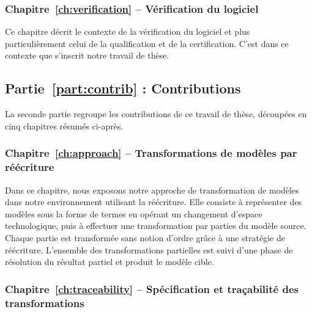 \subsubsection{Chapitre~\ref{ch:verification} -- Vérification du logiciel}

Ce chapitre décrit le contexte de la vérification du logiciel et plus
particulièrement celui de la qualification et de la certification. C'est dans
ce contexte que s'inscrit notre travail de thèse.

\subsection*{Partie~\ref{part:contrib} : Contributions}

La seconde partie regroupe les contributions de ce travail de thèse, découpées
en cinq chapitres résumés ci-après.


\subsubsection{Chapitre~\ref{ch:approach} -- Transformations de modèles par réécriture}

Dans ce chapitre, nous exposons notre approche de transformation de modèles
dans notre environnement utilisant la réécriture. Elle consiste à représenter
des modèles sous la forme de termes en opérant un changement d'espace
technologique, puis à effectuer une transformation par parties du modèle
source. Chaque partie est transformée sans notion d'ordre grâce à une stratégie
de réécriture. L'ensemble des transformations partielles est suivi d'une
phase de résolution du résultat partiel et produit le modèle cible.

\subsubsection{Chapitre~\ref{ch:traceability} -- Spécification et traçabilité des transformations}

